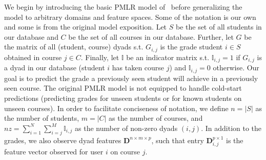 \documentclass[10pt]{proc}
\begin{document}
We begin by introducing the basic PMLR model
of~\cite{elbadrawy_personalized_2015} before generalizing the model to arbitrary
domains and feature spaces. Some of the notation is our own and some is from the
original model exposition. Let $S$ be the set of all students in our database
and $C$ be the set of all courses in our database. Further, let $G$ be the
matrix of all (student, course) dyads s.t. $G_{i,j}$ is the grade student $i \in
S$ obtained in course $j \in C$. Finally, let $\mathbb{I}$ be an indicator
matrix s.t.  $\mathbb{I}_{i,j} = 1$ if $G_{i,j}$ is a dyad in our database
(student $i$ has taken course $j$) and $\mathbb{I}_{i,j} = 0$ otherwise. Our
goal is to predict the grade a previously seen student will achieve in a
previously seen course. The original PMLR model is not equipped to handle
cold-start predictions (predicting grades for unseen students or for known
students on unseen courses). In order to facilitate conciseness of notation, we
define $n = |S|$ as the number of students, $m = |C|$ as the number of courses,
and $nz = \sum_{i=1}^N \sum_{i=j}^M \mathbb{I}_{i,j}$ as the number of non-zero
dyads $(i,j)$. In addition to the grades, we also observe dyad features
$\bm{D}^{n \times m \times p}$, such that entry $\bm{D}_{i,j}^{p \times 1}$ is
the feature vector observed for user $i$ on course $j$.
\end{document}
